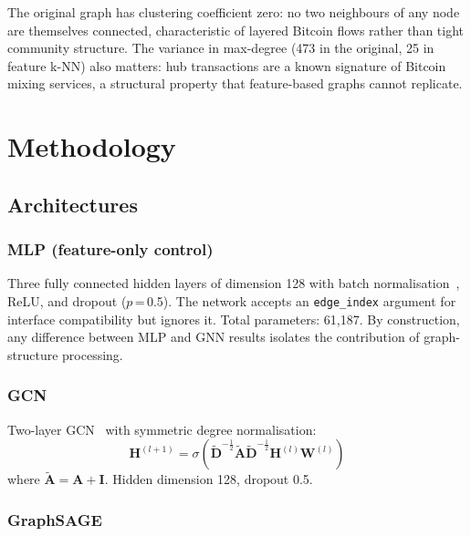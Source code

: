 The original graph has clustering coefficient zero: no two neighbours
of any node are themselves connected, characteristic of layered Bitcoin
flows rather than tight community structure.  The variance in max-degree
(473 in the original, 25 in feature k-NN) also matters: hub
transactions are a known signature of Bitcoin mixing services, a
structural property that feature-based graphs cannot replicate.


\section{Methodology}
\label{sec:methods}

\subsection{Architectures}

\subsubsection{MLP (feature-only control)}

Three fully connected hidden layers of dimension 128 with batch
normalisation~\citep{ioffe2015batchnorm}, ReLU, and dropout
($p$\,=\,0.5).  The network accepts an \texttt{edge\_index} argument
for interface compatibility but ignores it.  Total parameters: 61,187.
By construction, any difference between MLP and GNN results isolates
the contribution of graph-structure processing.

\subsubsection{GCN}

Two-layer GCN~\citep{kipf2017} with symmetric degree normalisation:
\begin{equation}
\mathbf{H}^{(l+1)} = \sigma\!\left(
  \tilde{\mathbf{D}}^{-\tfrac{1}{2}}
  \tilde{\mathbf{A}}
  \tilde{\mathbf{D}}^{-\tfrac{1}{2}}
  \mathbf{H}^{(l)} \mathbf{W}^{(l)}
\right)
\label{eq:gcn}
\end{equation}
where $\tilde{\mathbf{A}} = \mathbf{A}+\mathbf{I}$.  Hidden dimension
128, dropout 0.5.

\subsubsection{GraphSAGE}

